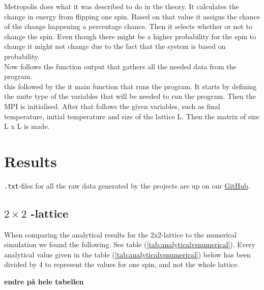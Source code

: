 \documentclass{article}
\begin{document}
Metropolis does what it was described to do in the theory. It calculates the change in energy from flipping one spin. Based on that value it assigns the chance of the change happening a percentage chance. Then it selects whether or not to change the spin. Even though there might be a higher probability for the spin to change it might not change due to the fact that the system is based on probability. \\

Now follows the function output that gathers all the needed data from the program. \\

this followed by the it main function that runs the program. It starts by defining the unite type of the variables that will be needed to run the program. Then the MPI is initialised. After that follows the given variables, such as final temperature, initial temperature and size of the lattice L. Then the matrix of size L x L is made.\\



\vspace{1cm}

\section{Results} \label{sec:Results}

\texttt{.txt}-files for all the raw data generated by the projects are up on our \href{https://github.com/Erikbgram/Fys3150}{GitHub}. \\

\subsection{\texorpdfstring{ $2 \times 2$ }{text}-lattice}

When comparing the analytical results for the 2x2-lattice to the numerical simulation we found the following. See table (\ref{tab:analyticalvsnumerical}). Every analytical value given in the table (\ref{tab:analyticalvsnumerical}) below has been divided by 4 to represent the values for one spin, and not the whole lattice.

\textbf{endre på hele tabellen}
\end{document}
